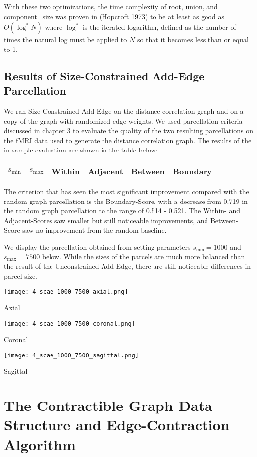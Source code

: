 With these two optimizations, the time complexity of root, union, and
component\_size was proven in (Hopcroft 1973) to be at least as good as
$O(\log^* N)$ where $\log^*$ is the iterated logarithm, defined as the
number of times the natural log must be applied to $N$ so that it
becomes less than or equal to 1.

\subsection{Results of Size-Constrained Add-Edge Parcellation}

We ran Size-Constrained Add-Edge on the distance correlation graph and
on a copy of the graph with randomized edge weights. We used
parcellation criteria discussed in chapter 3 to evaluate the quality of
the two resulting parcellations on the fMRI data used to generate the
distance correlation graph. The results of the in-sample evaluation are
shown in the table below:

\begin{tabular}{c c | c c c c}
    $s_{\min}$ & $s_{\max}$ & Within & Adjacent & Between & Boundary \\
    \hline
    
\end{tabular}

The criterion that has seen the most significant improvement compared
with the random graph parcellation is the Boundary-Score, with a
decrease from 0.719 in the random graph parcellation to the range of
0.514 - 0.521. The Within- and Adjacent-Scores saw smaller but still
noticeable improvements, and Between-Score saw no improvement from the
random baseline.

We display the parcellation obtained from setting parameters
$s_{\min} = 1000$ and $s_{\max} = 7500$ below. While the sizes of the
parcels are much more balanced than the result of the Unconstrained
Add-Edge, there are still noticeable differences in parcel size.

\begin{center}
\texttt{[image: 4\_scae\_1000\_7500\_axial.png]}

Axial

\texttt{[image: 4\_scae\_1000\_7500\_coronal.png]}

Coronal

\texttt{[image: 4\_scae\_1000\_7500\_sagittal.png]}

Sagittal
\end{center}
\section{The Contractible Graph Data Structure and
Edge-Contraction Algorithm}

